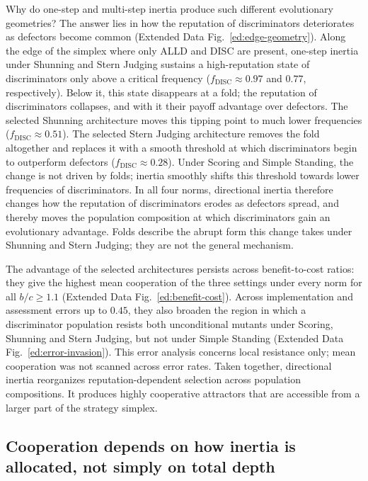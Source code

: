\documentclass[fleqn,10pt]{article}
\begin{document}
Why do one-step and multi-step inertia produce such different evolutionary geometries? The answer lies in how the reputation of discriminators deteriorates as defectors become common (Extended Data Fig.~\ref{ed:edge-geometry}). Along the edge of the simplex where only ALLD and DISC are present, one-step inertia under Shunning and Stern Judging sustains a high-reputation state of discriminators only above a critical frequency ($f_{\mathrm{DISC}}\approx0.97$ and $0.77$, respectively). Below it, this state disappears at a fold; the reputation of discriminators collapses, and with it their payoff advantage over defectors. The selected Shunning architecture moves this tipping point to much lower frequencies ($f_{\mathrm{DISC}}\approx0.51$). The selected Stern Judging architecture removes the fold altogether and replaces it with a smooth threshold at which discriminators begin to outperform defectors ($f_{\mathrm{DISC}}\approx0.28$). Under Scoring and Simple Standing, the change is not driven by folds; inertia smoothly shifts this threshold towards lower frequencies of discriminators. In all four norms, directional inertia therefore changes how the reputation of discriminators erodes as defectors spread, and thereby moves the population composition at which discriminators gain an evolutionary advantage. Folds describe the abrupt form this change takes under Shunning and Stern Judging; they are not the general mechanism.

The advantage of the selected architectures persists across benefit-to-cost ratios: they give the highest mean cooperation of the three settings under every norm for all $b/c\geq1.1$ (Extended Data Fig.~\ref{ed:benefit-cost}). Across implementation and assessment errors up to $0.45$, they also broaden the region in which a discriminator population resists both unconditional mutants under Scoring, Shunning and Stern Judging, but not under Simple Standing (Extended Data Fig.~\ref{ed:error-invasion}). This error analysis concerns local resistance only; mean cooperation was not scanned across error rates. Taken together, directional inertia reorganizes reputation-dependent selection across population compositions. It produces highly cooperative attractors that are accessible from a larger part of the strategy simplex.

\subsection*{Cooperation depends on how inertia is allocated, not simply on total depth}
\end{document}
